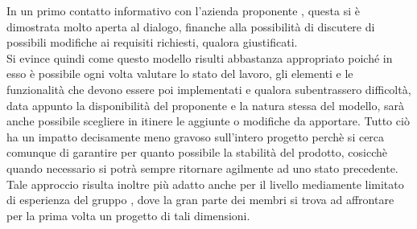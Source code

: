 In un primo contatto informativo con l'azienda proponente \proponente{}, questa si è dimostrata molto aperta al dialogo, finanche alla possibilità di discutere di possibili modifiche ai requisiti richiesti, qualora giustificati.\\
Si evince quindi come questo modello risulti abbastanza appropriato poiché in esso è possibile ogni volta valutare lo stato del lavoro, gli elementi e le funzionalità che devono essere poi implementati e qualora subentrassero difficoltà, data appunto la disponibilità del proponente e la natura stessa del modello, sarà anche possibile scegliere in itinere le aggiunte o modifiche da apportare. Tutto ciò ha un impatto decisamente meno gravoso sull'intero progetto perchè si cerca comunque di garantire per quanto possibile la stabilità del prodotto, cosicchè quando necessario si potrà sempre ritornare agilmente ad uno stato precedente. \\
Tale approccio risulta inoltre più adatto anche per il livello mediamente limitato di esperienza del gruppo \Gruppo{}, dove la gran parte dei membri si trova ad affrontare per la prima volta un progetto di tali dimensioni.